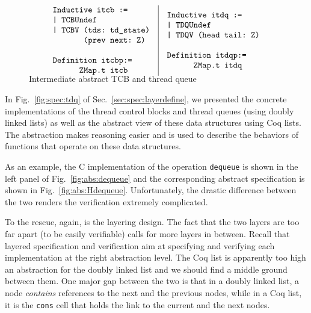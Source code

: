 {
\setlength{\floatsep}{-10pt}
\setlength{\belowcaptionskip}{-5pt}
\begin{figure}[ht]\scriptsize
$$
\begin{array}{l|l}
\begin{array}{l}
\verb+Inductive itcb :=+\\
\verb+| TCBUndef+\\
\verb+| TCBV (tds: td_state)+\\
\verb+       (prev next: Z)+\\
\\
\verb+Definition itcbp:=+\\
\verb+      ZMap.t itcb+
\end{array}
&
\begin{array}{l}
\verb+Inductive itdq :=+\\
\verb+| TDQUndef+\\
\verb+| TDQV (head tail: Z)+\\
\\
\verb+Definition itdqp:=+\\
\verb+      ZMap.t itdq+
\end{array}
\vspace*{-14pt}
\end{array}
$$ 
\caption{Intermediate abstract TCB and thread queue}
\label{fig:abs:ltdq}
\end{figure}
}

In Fig.~\ref{fig:spec:tdq} of Sec.~\ref{sec:spec:layerdefine}, we
presented the concrete implementations of the thread control blocks
and thread queues (using doubly linked lists) as well as the abstract
view of these data structures using Coq lists.  The abstraction 
makes reasoning easier and is used to describe the behaviors of
functions that operate on these data structures.

As an example, the C implementation of the operation \verb"dequeue" is shown
in the left panel of Fig.\ \ref{fig:abs:dequeue} and the corresponding
abstract specification is shown in Fig.\ \ref{fig:abs:Hdequeue}.
Unfortunately, the drastic difference between the two renders
the verification extremely complicated.

To the rescue, again, is the layering design.  The fact that the two
layers are too far apart (to be easily verifiable) calls for more
layers in between.  Recall that layered specification and verification
aim at specifying and verifying each implementation at the right
abstraction level.  The Coq list is apparently too high an abstraction
for the doubly linked list and we should find a middle ground between
them.  One major gap between the two is that in a doubly linked list,
a node {\em contains} references to the next and the previous nodes,
while in a Coq list, it is the \verb"cons" cell that holds the link to
the current and the next nodes.

